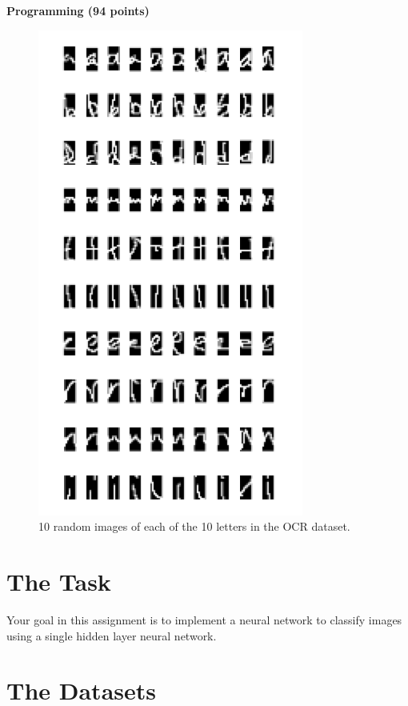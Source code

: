 \documentclass[11pt,addpoints,answers]{exam}
\begin{document}
\begin{your_solution}[height=6cm]

\end{your_solution}
\newpage

{\LARGE \bf Programming (94 points)}

\begin{figure}[H]
    \centering
    \captionsetup{justification=centering, margin=2cm}
    \includegraphics[scale=0.8]{img/lettergrid.png}
    \caption{10 random images of each of the 10 letters in the OCR dataset.}
    \label{fig:grid}
\end{figure}

\section{The Task}
Your goal in this assignment is to implement a neural network to classify images using a single hidden layer neural network.

\section{The Datasets}
\label{sec:dataset}
\end{document}
